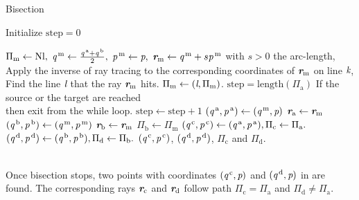 \begin{algorithm}
\caption{Bisection}\label{alg:bisection}
Initialize $\textrm{step} = 0$
\begin{algorithmic}[1]
\State $\Pi_{\textrm{m}}\gets \textrm{Nl},$
\State $\textit{q}^{\,\textrm{m}}\gets \frac{\textit{q}^{\,\textrm{a}}+\textit{q}^{\,\textrm{b}}}{2},$ 
\State $\textit{p}^{\,\textrm{m}}\gets\textit{p},$
\State $\textit{\textbf{r}}_{\textrm{m}}\gets \textit{q}^{\,\textrm{m}}+s \textit{p}^{\,\textrm{m}}$ with $s>0$ the arc-length,
\State Apply the inverse of ray tracing to the corresponding coordinates of $\textit{\textbf{r}}_{\textrm{m}}$ on line $\textit{k}$,
\State Find the line $\textit{l}$ that the ray $\textit{\textbf{r}}_{\textrm{m}}$ hits.
\State $\Pi_{\textrm{m}}\gets (\textit{l},\Pi_{\textrm{m}})$.
\State $\textrm{step} = \mbox{length}(\Pi_\textrm{a})$ \Comment If the source or the target are reached \\  \Comment then exit from the while loop.
\Else \State $\textrm{step}\gets\textrm{step}+1$ 
\EndIf
\EndWhile
{}
\State $(\textit{q}^{\,\textrm{a}}, \textit{p}^{\,\textrm{a}})\gets (\textit{q}^{\,\textrm{m}}, \textit{p})$
\State $\textit{\textbf{r}}_{\textrm{a}}\gets \textit{\textbf{r}}_{\textrm{m}}$
\Else 
\State $(\textit{q}^{\,\textrm{b}}, \textit{p}^{\,\textrm{b}})\gets (\textit{q}^{\,\textrm{m}}, \textit{p}^{\,\textrm{m}})$
\State $\textit{\textbf{r}}_{\textrm{b}}\gets \textit{\textbf{r}}_{\textrm{m}}$
\State $\Pi_\textrm{b}\gets \Pi_{\textrm{m}}$
\EndIf
\EndWhile
\State $(\textit{q}^{\,\textrm{c}}, \textit{p}^{\,\textrm{c}})\gets (\textit{q}^{\,\textrm{a}}, \textit{p}^{\,\textrm{a}}), \Pi_\textrm{c}\gets \Pi_{\textrm{a}}.$
\State $(\textit{q}^{\,\textrm{d}}, \textit{p}^{\,\textrm{d}})\gets (\textit{q}^{\,\textrm{b}}, \textit{p}^{\,\textrm{b}}), \Pi_\textrm{d}\gets \Pi_{\textrm{b}}.$
\State \Return $(\textit{q}^{\,\textrm{c}}, \textit{p}^{\,\textrm{c}})$, $(\textit{q}^{\,\textrm{d}}, \textit{p}^{\,\textrm{d}})$, $\Pi_{\textrm{c}}$ and $\Pi_{\textrm{d}}$.
\end{algorithmic}
\end{algorithm}
\\ \indent Once bisection stops, two points with coordinates $(\textit{q}^{\,\textrm{c}}, \textit{p})$ and $(\textit{q}^{\,\textrm{d}}, \textit{p})$ in  are found. The corresponding rays $\textit{\textbf{r}}_{\textrm{c}}$ and $\textit{\textbf{r}}_{\textrm{d}}$ follow path $\Pi_{\textrm{c}}=\Pi_{\textrm{a}}$ and $\Pi_{\textrm{d}}\neq\Pi_{\textrm{a}}$. 
